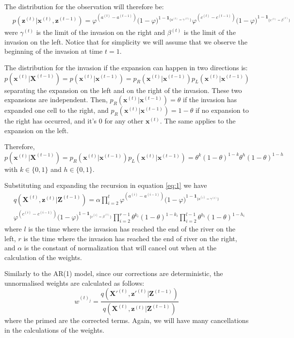 \documentclass[11pt,a4paper]{article}
\newcommand{\one}[1]{\mathbf{1}_{\{#1\}}}
\renewcommand{\vec}[1]{\mathbf{#1}}
\begin{document}
The distribution for the observation will therefore be:
\begin{align*}
    & p(\vec{z}^{(t)} | \vec{x}^{(t)}, \vec{z}^{(t-1)}) = \varphi^{(a^{(t)} - a^{(t-1)})} \bigg(1 - \varphi \bigg)^{1-\one {a^{(t)}=\gamma^{(t)}}} \varphi^{(c^{(t)} - c^{(t-1)})} \bigg( 1 - \varphi \bigg)^{1-\one {c^{(t)}=\beta^{(t)}}}
\end{align*}
were $\gamma^{(t)}$ is the limit of the invasion on the right and $\beta^{(t)}$ is the limit of the invasion on the left.
Notice that for simplicity we will assume that we observe the beginning of the invasion at time $t=1$. 

The distribution for the invasion if the expansion can happen in two directions is:
\[
    p(\vec{x}^{(t)} | \vec{X}^{(t-1)}) = p(\vec{x}^{(t)} | \vec{x}^{(t-1)}) = p_R(\vec{x}^{(t)} | \vec{x}^{(t-1)}) p_L(\vec{x}^{(t)} | \vec{x}^{(t-1)}) 
\]
separating the expansion on the left and on the right of the invasion.
These two expansions are independent. Then, $p_R(\vec{x}^{(t)} | \vec{x}^{(t-1)}) = \theta$ if the invasion has expanded one cell to the right, and $p_R(\vec{x}^{(t)} | \vec{x}^{(t-1)}) = 1 - \theta$ if no expansion to the right has occurred, and it's 0 for any other $\vec{x}^{(t)}$. The same applies to the expansion on the left.

Therefore,
\[
    p(\vec{x}^{(t)} | \vec{X}^{(t-1)}) = p_R(\vec{x}^{(t)} | \vec{x}^{(t-1)}) p_L(\vec{x}^{(t)} | \vec{x}^{(t-1)}) = \theta^{k} (1-\theta)^{1-k}\theta^{h} (1-\theta)^{1-h}
\]
with $k \in \{0,1\}$ and $h \in \{0,1\}$.

Substituting and expanding the recursion in equation \eqref{eq:1} we have
\begin{align*}
        & q(\vec{X}^{(t)},\vec{z}^{(t)} | \vec{Z}^{(t-1)}) = \alpha \prod_{i=2}^{t} \varphi^{(a^{(i)} - a^{(i-1)})} \bigg(1 - \varphi\bigg)^{1-\one {a^{(i)}=\gamma^{(t)}}} \\
        &\varphi^{(c^{(i)} - c^{(i-1)})} \bigg(1 - \varphi\bigg)^{1-\one {c^{(i)}=\beta^{(t)}}} \prod_{i=2}^{r-1} \theta^{k_i} (1-\theta)^{1-k_i} \prod_{i=2}^{l-1} \theta^{h_i} (1-\theta)^{1-h_i}
\end{align*}
where $l$ is the time where the invasion has reached the end of the river on the left, $r$ is the time where the invasion has reached the end of river on the right, and $\alpha$ is the constant of normalization that will cancel out when at the calculation of the weights. 

Similarly to the AR(1) model, since our corrections are deterministic, the unnormalised weights are calculated as follows:
\[
    w^{(t)_j} = \frac{q(\vec{X'}^{(t)},\vec{z'}^{(t)} | \vec{Z}^{(t-1)})}{q(\vec{X}^{(t)},\vec{z}^{(t)} | \vec{Z}^{(t-1)})}
\]
where the primed are the corrected terms. Again, we will have many cancellations in the calculations of the weights.
\end{document}
